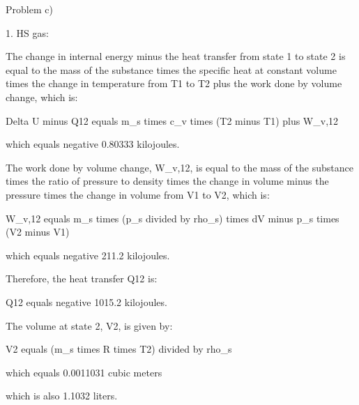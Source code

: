 Problem c)

1. HS gas:

The change in internal energy minus the heat transfer from state 1 to state 2 is equal to the mass of the substance times the specific heat at constant volume times the change in temperature from T1 to T2 plus the work done by volume change, which is:

Delta U minus Q12 equals m_s times c_v times (T2 minus T1) plus W_v,12

which equals negative 0.80333 kilojoules.

The work done by volume change, W_v,12, is equal to the mass of the substance times the ratio of pressure to density times the change in volume minus the pressure times the change in volume from V1 to V2, which is:

W_v,12 equals m_s times (p_s divided by rho_s) times dV minus p_s times (V2 minus V1)

which equals negative 211.2 kilojoules.

Therefore, the heat transfer Q12 is:

Q12 equals negative 1015.2 kilojoules.

The volume at state 2, V2, is given by:

V2 equals (m_s times R times T2) divided by rho_s

which equals 0.0011031 cubic meters

which is also 1.1032 liters.